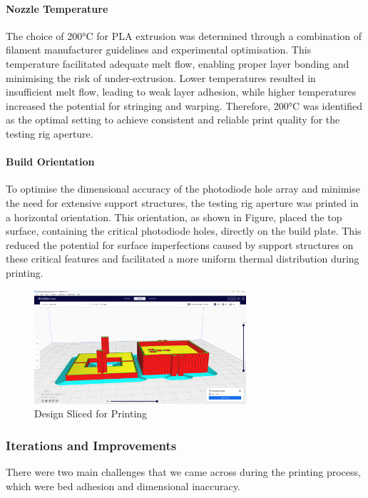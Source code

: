 \paragraph{Nozzle Temperature}

The choice of 200°C for PLA extrusion was determined through a combination of filament manufacturer guidelines and experimental optimisation. 
This temperature facilitated adequate melt flow, enabling proper layer bonding and minimising the risk of under-extrusion. 
Lower temperatures resulted in insufficient melt flow, leading to weak layer adhesion, while higher temperatures increased the potential for stringing and warping. 
Therefore, 200°C was identified as the optimal setting to achieve consistent and reliable print quality for the testing rig aperture.

\paragraph{Build Orientation}

To optimise the dimensional accuracy of the photodiode hole array and minimise the need for extensive support structures, the testing rig aperture was printed in a horizontal orientation. 
This orientation, as shown in Figure, placed the top surface, containing the critical photodiode holes, directly on the build plate. 
This reduced the potential for surface imperfections caused by support structures on these critical features and facilitated a more uniform thermal distribution during printing.

\begin{figure}[htbp]
    \centering
    \includegraphics[width=0.7\textwidth]{figures/CAD-3DPrint/SLICED.png}
    \caption{Design Sliced for Printing}
    \label{fig:sliced}
   
    
\end{figure}

\subsubsection{Iterations and Improvements}
There were two main challenges that we came across during the printing process, which were bed adhesion and dimensional inaccuracy.


